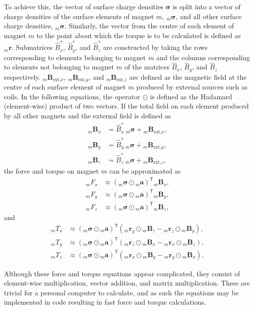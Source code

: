 To achieve this, the vector of surface charge densities \(\bm{\sigma}\) is split into a vector of charge densities of the surface elements of magnet \(m\), \({}_m\bm{\sigma}\), and all other surface charge densities, \({}_{\overline{m}}\bm{\sigma}\). Similarly, the vector from the centre of each element of magnet \(m\) to the point about which the torque is to be calculated is defined as \({}_m\mathbf{r}\). Submatrices \(\hat{B}^*_x\), \(\hat{B}^*_y\), and \(\hat{B}^*_z\) are constructed by taking the rows corresponding to elements belonging to magnet \(m\) and the columns corresponding to elements not belonging to magnet \(m\) of the matrices \(\hat{B}_x\), \(\hat{B}_y\), and \(\hat{B}_z\) respectively. \({}_m\mathbf{B}_{\text{ext,}x}\), \({}_m\mathbf{B}_{\text{ext,}y}\), and \({}_m\mathbf{B}_{\text{ext,}z}\) are defined as the magnetic field at the centre of each surface element of magnet \(m\) produced by external sources such as coils. In the following equations, the operator \(\odot\) is defined as the Hadamard (element-wise) product of two vectors. If the total field on each element produced by all other magnets and the external field is defined as
\begin{align*}
    _m\mathbf{B}_x &= \hat{B}^*_x\ {}_{\overline{m}}\bm{\sigma} + {}_m\mathbf{B}_{\text{ext,}x} \text{,} \\
    _m\mathbf{B}_y &= \hat{B}^*_y\ {}_{\overline{m}}\bm{\sigma} + {}_m\mathbf{B}_{\text{ext,}y} \text{,} \\
    _m\mathbf{B}_z &= \hat{B}^*_z\ {}_{\overline{m}}\bm{\sigma} + {}_m\mathbf{B}_{\text{ext,}z} \text{,}
\end{align*}
the force and torque on magnet \(m\) can be approximated as
\begin{align}
	_mF_x &\approx \left( {}_m\bm{\sigma} \odot {}_m\mathbf{a} \right)^\mathsf{T} {}_m\mathbf{B}_x \text{,} \\
	_mF_y &\approx \left( {}_m\bm{\sigma} \odot {}_m\mathbf{a} \right)^\mathsf{T} {}_m\mathbf{B}_y \text{,} \\
	_mF_z &\approx \left( {}_m\bm{\sigma} \odot {}_m\mathbf{a} \right)^\mathsf{T} {}_m\mathbf{B}_z \text{,}
\end{align}
and
\begin{align}
	_mT_x &\approx \left( {}_m\bm{\sigma} \odot {}_m\mathbf{a} \right)^\mathsf{T} \left( {}_m\mathbf{r}_y \odot {}_m\mathbf{B}_z - {}_m\mathbf{r}_z \odot {}_m\mathbf{B}_y \right) \text{,} \\
	_mT_y &\approx \left( {}_m\bm{\sigma} \odot {}_m\mathbf{a} \right)^\mathsf{T} \left( {}_m\mathbf{r}_z \odot {}_m\mathbf{B}_x - {}_m\mathbf{r}_x \odot {}_m\mathbf{B}_z \right) \text{,} \\
	_mT_z &\approx \left( {}_m\bm{\sigma} \odot {}_m\mathbf{a} \right)^\mathsf{T} \left( {}_m\mathbf{r}_x \odot {}_m\mathbf{B}_y - {}_m\mathbf{r}_y \odot {}_m\mathbf{B}_x \right) \text{.}
\end{align}

Although these force and torque equations appear complicated, they consist of element-wise multiplication, vector addition, and matrix multiplication. These are trivial for a personal computer to calculate, and as such the equations may be implemented in code resulting in fast force and torque calculations.